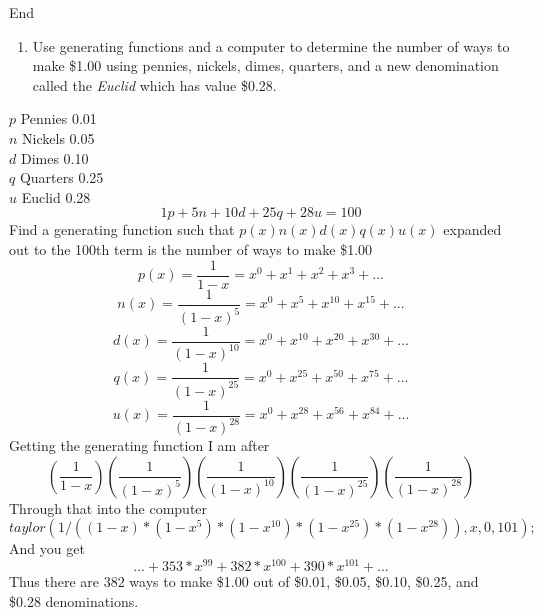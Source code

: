 \documentclass[10pt, AMS Euler]{article}
\begin{document}
\begin{enumerate}[resume]
            End


     
        \end{enumerate}
		
        
        \newpage
        \begin{enumerate}[resume]
		\item Use generating functions and a computer to determine the number of ways to make \$1.00 using pennies, nickels, dimes, quarters, and a new denomination called the \emph{Euclid} which has value \$0.28.
	\end{enumerate}
        
        $p$ Pennies 0.01 \\
        $n$ Nickels 0.05 \\
        $d$ Dimes 0.10 \\
        $q$ Quarters 0.25 \\
        $u$ Euclid 0.28 \\
        $$ 1p + 5n + 10d + 25q + 28u = 100 $$
        Find a generating function such that $ p(x) n(x) d(x) q(x) u(x) $ expanded out to the 100th term is the number of ways to make \$1.00
	$$ p(x) = \frac{1}{1-x} = x^0+x^1+x^2+x^3+... $$
        $$ n(x) = \frac{1}{(1-x)^5} = x^0+x^5+x^{10}+x^{15}+... $$
        $$ d(x) = \frac{1}{(1-x)^{10}} = x^0+x^{10}+x^{20}+x^{30}+... $$
	$$ q(x) = \frac{1}{(1-x)^{25}} = x^0+x^{25}+x^{50}+x^{75}+... $$
	$$ u(x) = \frac{1}{(1-x)^{28}} = x^0+x^{28}+x^{56}+x^{84}+... $$
        Getting the generating function I am after
        $$ (\frac{1}{1-x}) (\frac{1}{(1-x)^5}) (\frac{1}{(1-x)^{10}}) (\frac{1}{(1-x)^{25}}) (\frac{1}{(1-x)^{28}}) $$
        Through that into the computer
        $$ taylor(1/((1-x)*(1-x^5)*(1-x^{10})*(1-x^{25})*(1-x^{28})),x,0,101); $$
        And you get
        $$ ... + 353*x^{99}+382*x^{100}+390*x^{101} + ... $$
        Thus there are $382$ ways to make \$1.00 out of \$0.01, \$0.05, \$0.10, \$0.25, and \$0.28 denominations. 



 
	\noindent \underline{\hspace{3in}}\\
	
	
	
	
\end{document}
